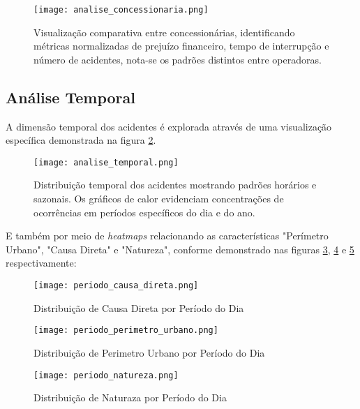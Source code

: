 \documentclass[conference]{IEEEtran}
\begin{document}
\begin{figure}[!htb]
    \centering
    \texttt{[image: analise\_concessionaria.png]}
    \caption{Visualização comparativa entre concessionárias, identificando métricas normalizadas de prejuízo financeiro, tempo de interrupção e número de acidentes, nota-se os padrões distintos entre operadoras.}
    \label{fig:analise_concessionaria}
\end{figure}

\subsection{Análise Temporal}

A dimensão temporal dos acidentes é explorada através de uma visualização específica demonstrada na figura \ref{fig:analise_temporal}.

\begin{figure}[H]
    \centering
    \texttt{[image: analise\_temporal.png]}
    \caption{Distribuição temporal dos acidentes mostrando padrões horários e sazonais. Os gráficos de calor evidenciam concentrações de ocorrências em períodos específicos do dia e do ano.}
    \label{fig:analise_temporal}
\end{figure}

E também por meio de \textit{heatmaps} relacionando as características "Perímetro Urbano", "Causa Direta" e "Natureza", conforme demonstrado nas figuras \ref{fig:periodo_causa_direta}, \ref{fig:periodo_perimetro_urbano} e \ref{fig:periodo_natureza} respectivamente:

\begin{figure}[!htb]
    \centering
    \texttt{[image: periodo\_causa\_direta.png]}
    \caption{Distribuição de Causa Direta por Período do Dia}
    \label{fig:periodo_causa_direta}
\end{figure}

\begin{figure}[!htb]
    \centering
    \texttt{[image: periodo\_perimetro\_urbano.png]}
    \caption{Distribuição de Perimetro Urbano por Período do Dia}
    \label{fig:periodo_perimetro_urbano}
\end{figure}

\begin{figure}[!htb]
    \centering
    \texttt{[image: periodo\_natureza.png]}
    \caption{Distribuição de Naturaza por Período do Dia}
    \label{fig:periodo_natureza}
\end{figure}
\end{document}
